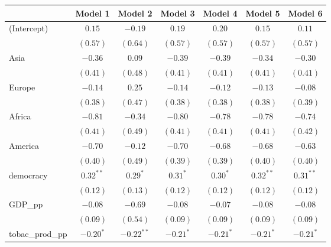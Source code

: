 
\begin{table}[!h]
\begin{center}
\begin{tabular}{l c c c c c c }
\toprule
 & Model 1 & Model 2 & Model 3 & Model 4 & Model 5 & Model 6 \\
\midrule
(Intercept)             & $0.15$       & $-0.19$      & $0.19$       & $0.20$       & $0.15$       & $0.11$       \\
                        & $(0.57)$     & $(0.64)$     & $(0.57)$     & $(0.57)$     & $(0.57)$     & $(0.57)$     \\
Asia                    & $-0.36$      & $0.09$       & $-0.39$      & $-0.39$      & $-0.34$      & $-0.30$      \\
                        & $(0.41)$     & $(0.48)$     & $(0.41)$     & $(0.41)$     & $(0.41)$     & $(0.41)$     \\
Europe                  & $-0.14$      & $0.25$       & $-0.14$      & $-0.12$      & $-0.13$      & $-0.08$      \\
                        & $(0.38)$     & $(0.47)$     & $(0.38)$     & $(0.38)$     & $(0.38)$     & $(0.39)$     \\
Africa                  & $-0.81$      & $-0.34$      & $-0.80$      & $-0.78$      & $-0.78$      & $-0.74$      \\
                        & $(0.41)$     & $(0.49)$     & $(0.41)$     & $(0.41)$     & $(0.41)$     & $(0.42)$     \\
America                 & $-0.70$      & $-0.12$      & $-0.70$      & $-0.68$      & $-0.68$      & $-0.63$      \\
                        & $(0.40)$     & $(0.49)$     & $(0.39)$     & $(0.39)$     & $(0.40)$     & $(0.40)$     \\
democracy               & $0.32^{**}$  & $0.29^{*}$   & $0.31^{*}$   & $0.30^{*}$   & $0.32^{**}$  & $0.31^{**}$  \\
                        & $(0.12)$     & $(0.13)$     & $(0.12)$     & $(0.12)$     & $(0.12)$     & $(0.12)$     \\
GDP\_pp                 & $-0.08$      & $-0.69$      & $-0.08$      & $-0.07$      & $-0.08$      & $-0.08$      \\
                        & $(0.09)$     & $(0.54)$     & $(0.09)$     & $(0.09)$     & $(0.09)$     & $(0.09)$     \\
tobac\_prod\_pp         & $-0.20^{*}$  & $-0.22^{**}$ & $-0.21^{*}$  & $-0.21^{*}$  & $-0.21^{*}$  & $-0.21^{*}$  \\

\end{tabular}
\end{center}
\end{table}
